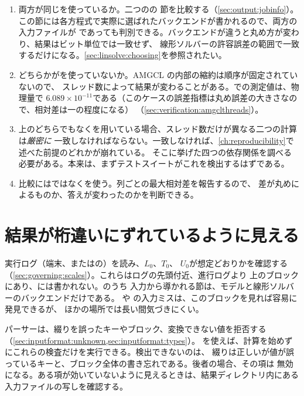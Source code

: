\begin{enumerate}
  \item 両方が同じを使っているか。二つのの
    節を比較する（\cref{sec:output:jobinfo}）。
    この節には各方程式で実際に選ばれたバックエンドが書かれるので、両方の入力ファイルが
    であっても判別できる。バックエンドが違うと丸め方が変わり、結果はビット単位では一致せず、
    線形ソルバーの許容誤差の範囲で一致するだけになる。\cref{sec:linsolve:choosing}を参照されたい。
  \item どちらかがを使っていないか。AMGCL の内部の縮約は順序が固定されていないので、
    スレッド数によって結果が変わることがある。での測定値は、物理量で
    $6.089\times10^{-11}$である（このケースの誤差指標は丸め誤差の大きさなので、相対差は一の程度になる）
    （\cref{sec:verification:amgclthreads}）。
  \item 上のどちらでもなくを用いている場合、スレッド数だけが異なる二つの計算は\emph{厳密に}
    一致しなければならない。一致しなければ、\cref{ch:reproducibility}で述べた前提のどれかが崩れている。
    そこに挙げた四つの依存関係を調べる必要がある。本来は、まずテストスイートがこれを検出するはずである。
  \item 比較にはではなくを使う。列ごとの最大相対差を報告するので、
    差が丸めによるものか、答えが変わったのかを判断できる。
\end{enumerate}

\section{結果が桁違いにずれているように見える}
\label{sec:trouble:scales}

実行ログ（端末、またはの）を読み、$L_0$、$T_0$、
$U_0$が想定どおりかを確認する（\cref{sec:governing:scales}）。これらはログの先頭付近、進行ログより
上のブロックにあり、には書かれない。のうち
入力から導かれる節は、モデルと線形ソルバーのバックエンドだけである。
や
の入力ミスは、このブロックを見れば容易に発見できるが、
ほかの場所では長い間気づきにくい。

パーサーは、綴りを誤ったキーやブロック、変換できない値を拒否する
（\cref{sec:inputformat:unknown,sec:inputformat:types}）。
を使えば、計算を始めずにこれらの検査だけを実行できる。検出できないのは、
綴りは正しいが値が誤っているキーと、\key{[Physics.*]}ブロック全体の書き忘れである。後者の場合、その項は
無効になる。ある項が効いていないように見えるときは、結果ディレクトリ内にある入力ファイルの写しを確認する。

